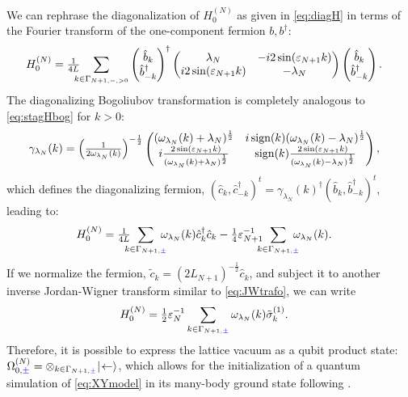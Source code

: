 \documentclass[a4paper, 11pt]{article}
\DeclareMathOperator{\1}{\mathds{1}}
\DeclareMathOperator{\sign}{\textup{sign}}
\begin{document}
We can rephrase the diagonalization of $H^{(N)}_{0}$ as given in \eqref{eq:diagH} in terms of the Fourier transform of the one-component fermion $b, b^{\dag}$:
\begin{align}
\label{eq:FstagH1c}
H^{(N)}_{0} & = \tfrac{1}{4L}\hspace{-0.25cm}\sum_{k\in\Gamma_{N+1,-,>0}}\begin{pmatrix} \hat{b}_{k} \\ \hat{b}^{\dag}_{-k} \end{pmatrix}^{\dagger} \begin{pmatrix} \lambda_{N} & -i2\sin(\vep_{N+1}k) \\ i2\sin(\vep_{N+1}k) & -\lambda_{N} \end{pmatrix} \begin{pmatrix} \hat{b}_{k} \\ \hat{b}^{\dag}_{-k} \end{pmatrix}.
\end{align}
The diagonalizing Bogoliubov transformation is completely analogous to \eqref{eq:stagHbog} for $k>0$:
\begin{align}
\label{eq:stagHbog1c}
\gamma_{\lambda_{N}}(k) & = \Big(\tfrac{1}{2\omega_{\lambda_{N}}(k)}\Big)^{-\frac{1}{2}}\begin{pmatrix} (\omega_{\lambda_{N}}(k)+\lambda_{N})^{\frac{1}{2}} & i\sign(k)(\omega_{\lambda_{N}}(k)-\lambda_{N})^{\frac{1}{2}} \\ i\frac{2\sin(\vep_{N+1}k)}{(\omega_{\lambda_{N}}(k)+\lambda_{N})^{\frac{1}{2}}} & \sign(k)\frac{2\sin(\vep_{N+1}k)}{(\omega_{\lambda_{N}}(k)-\lambda_{N})^{\frac{1}{2}}} \end{pmatrix},
\end{align}
which defines the diagonalizing fermion, $(\hat{c}_{k}, \hat{c}^{\dag}_{-k})^{t}=\gamma_{\lambda_{N}}(k)^{\dagger}(\hat{b}_{k}, \hat{b}^{\dag}_{-k})^{t}$,
leading to:
\begin{align}
\label{eq:diagH1c}
H^{(N)}_{0} & = \tfrac{1}{4L}\hspace{-0.25cm}\sum_{k\in\Gamma_{N+1,{\color{blue}\pm}}}\hspace{-0.25cm}\omega_{\lambda_{N}}(k)\hat{c}^{\dag}_{k}\hat{c}_{k} - \tfrac{1}{4}\vep_{N+1}^{-1}\hspace{-0.25cm}\sum_{k\in\Gamma_{N+1,{\color{blue}\pm}}}\hspace{-0.25cm}\omega_{\lambda_{N}}(k).
\end{align}
If we normalize the fermion, $\tilde{c}_{k} = (2L_{N+1})^{-\frac{1}{2}}\hat{c}_{k}$, and subject it to another inverse Jordan-Wigner transform similar to \eqref{eq:JWtrafo}, we can write
\begin{align}
\label{eq:diagH1cnorm}
H^{(N)}_{0} & = \tfrac{1}{2}\varepsilon_{N}^{-1}\sum_{k\in\Gamma_{N+1,{\color{blue}\pm}}}\omega_{\lambda_{N}}(k)\tilde{\sigma}^{(1)}_{k}.
\end{align}
Therefore, it is possible to express the lattice vacuum as a qubit product state: $\Omega^{(N)}_{0,{\color{blue}\pm}}=\otimes_{k\in\Gamma_{N+1,{\color{blue}\pm}}}|\!\leftarrow\rangle$, which allows for the initialization of a quantum simulation of \eqref{eq:XYmodel} in its many-body ground state following \cite{VerstraeteQuantumCircuitsFor}.
\end{document}
